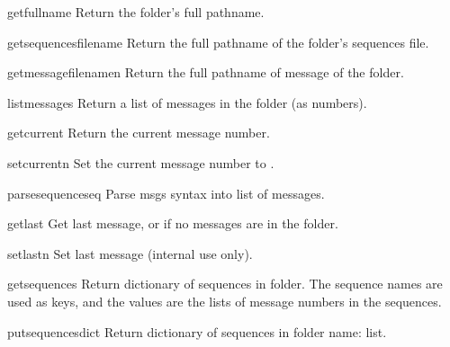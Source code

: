 \begin{methoddesc}[Folder]{getfullname}{}
Return the folder's full pathname.
\end{methoddesc}

\begin{methoddesc}[Folder]{getsequencesfilename}{}
Return the full pathname of the folder's sequences file.
\end{methoddesc}

\begin{methoddesc}[Folder]{getmessagefilename}{n}
Return the full pathname of message  of the folder.
\end{methoddesc}

\begin{methoddesc}[Folder]{listmessages}{}
Return a list of messages in the folder (as numbers).
\end{methoddesc}

\begin{methoddesc}[Folder]{getcurrent}{}
Return the current message number.
\end{methoddesc}

\begin{methoddesc}[Folder]{setcurrent}{n}
Set the current message number to .
\end{methoddesc}

\begin{methoddesc}[Folder]{parsesequence}{seq}
Parse msgs syntax into list of messages.
\end{methoddesc}

\begin{methoddesc}[Folder]{getlast}{}
Get last message, or  if no messages are in the folder.
\end{methoddesc}

\begin{methoddesc}[Folder]{setlast}{n}
Set last message (internal use only).
\end{methoddesc}

\begin{methoddesc}[Folder]{getsequences}{}
Return dictionary of sequences in folder.  The sequence names are used 
as keys, and the values are the lists of message numbers in the
sequences.
\end{methoddesc}

\begin{methoddesc}[Folder]{putsequences}{dict}
Return dictionary of sequences in folder {name: list}.
\end{methoddesc}


